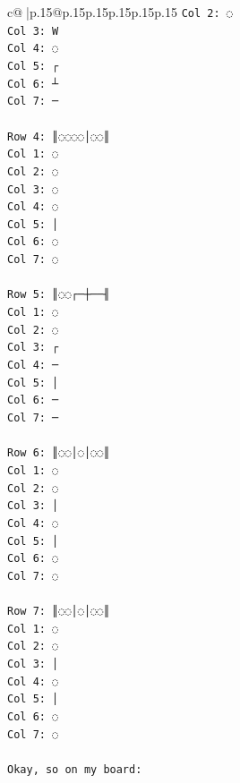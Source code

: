 \documentclass{article}
\begin{document}
{\begin{supertabular}{c@{$\;$}|p{.15\linewidth}@{}p{.15\linewidth}p{.15\linewidth}p{.15\linewidth}p{.15\linewidth}p{.15\linewidth}}
{{{\texttt{Col 2: ◌} \\
\texttt{Col 3: W} \\
\texttt{Col 4: ◌} \\
\texttt{Col 5: ┌} \\
\texttt{Col 6: ┴} \\
\texttt{Col 7: ─} \\
\\ 
\texttt{Row 4: ║◌◌◌◌│◌◌║} \\
\texttt{Col 1: ◌} \\
\texttt{Col 2: ◌} \\
\texttt{Col 3: ◌} \\
\texttt{Col 4: ◌} \\
\texttt{Col 5: │} \\
\texttt{Col 6: ◌} \\
\texttt{Col 7: ◌} \\
\\ 
\texttt{Row 5: ║◌◌┌─┼──╢} \\
\texttt{Col 1: ◌} \\
\texttt{Col 2: ◌} \\
\texttt{Col 3: ┌} \\
\texttt{Col 4: ─} \\
\texttt{Col 5: │} \\
\texttt{Col 6: ─} \\
\texttt{Col 7: ─} \\
\\ 
\texttt{Row 6: ║◌◌│◌│◌◌║} \\
\texttt{Col 1: ◌} \\
\texttt{Col 2: ◌} \\
\texttt{Col 3: │} \\
\texttt{Col 4: ◌} \\
\texttt{Col 5: │} \\
\texttt{Col 6: ◌} \\
\texttt{Col 7: ◌} \\
\\ 
\texttt{Row 7: ║◌◌│◌│◌◌║} \\
\texttt{Col 1: ◌} \\
\texttt{Col 2: ◌} \\
\texttt{Col 3: │} \\
\texttt{Col 4: ◌} \\
\texttt{Col 5: │} \\
\texttt{Col 6: ◌} \\
\texttt{Col 7: ◌} \\
\\ 
\texttt{Okay, so on my board:} \\
}}}
\end{supertabular}}
\end{document}
